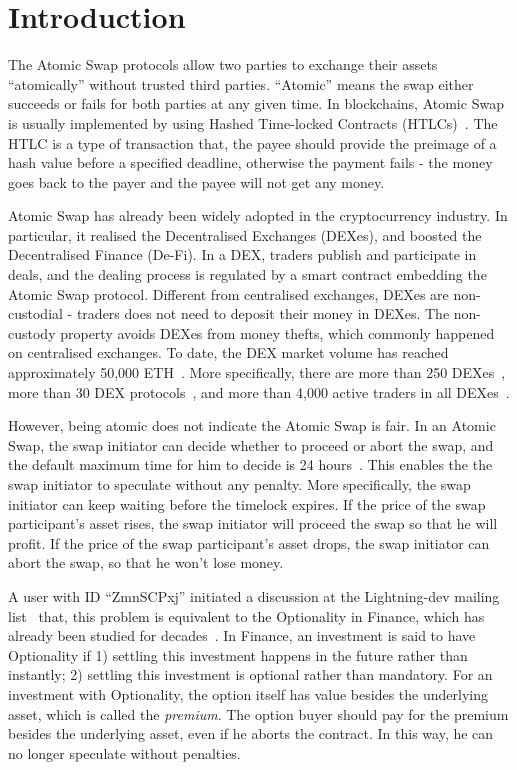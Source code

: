 \section{Introduction}
\label{sec:intro}

The Atomic Swap protocols allow two parties to exchange their assets ``atomically'' without trusted third parties.
``Atomic'' means the swap either succeeds or fails for both parties at any given time.
In blockchains, Atomic Swap is usually implemented by using Hashed Time-locked Contracts (HTLCs)~\cite{poon2016bitcoin}.
The HTLC is a type of transaction that, the payee should provide the preimage of a hash value before a specified deadline, otherwise the payment fails - the money goes back to the payer and the payee will not get any money.

Atomic Swap has already been widely adopted in the cryptocurrency industry.
In particular, it realised the Decentralised Exchanges (DEXes), and boosted the Decentralised Finance (De-Fi).
In a DEX, traders publish and participate in deals, and the dealing process is regulated by a smart contract embedding the Atomic Swap protocol.
Different from centralised exchanges, DEXes are non-custodial - traders does not need to deposit their money in DEXes.
The non-custody property avoids DEXes from money thefts, which commonly happened on centralised exchanges.
To date, the DEX market volume has reached approximately 50,000 ETH~\cite{dexwatch}.
More specifically,
there are more than 250 DEXes~\cite{distribuyed/index},
more than 30 DEX protocols~\cite{evbots/dex-protocols},
and more than 4,000 active traders in all DEXes~\cite{dexwatch}.



However, being atomic does not indicate the Atomic Swap is fair.
In an Atomic Swap, the swap initiator can decide whether to proceed or abort the swap, and the default maximum time for him to decide is 24 hours~\cite{nolan2013alt}.
This enables the the swap initiator to speculate without any penalty.
More specifically, the swap initiator can keep waiting before the timelock expires.
If the price of the swap participant's asset rises, the swap initiator will proceed the swap so that he will profit.
If the price of the swap participant's asset drops, the swap initiator can abort the swap, so that he won't lose money.

A user with ID ``ZmnSCPxj'' initiated a discussion at the Lightning-dev mailing list~\cite{optionality-origin} that, this problem is equivalent to the Optionality in Finance, which has already been studied for decades~\cite{higham2004introduction}.
In Finance, an investment is said to have Optionality if
1) settling this investment happens in the future rather than instantly;
2) settling this investment is optional rather than mandatory.
For an investment with Optionality, the option itself has value besides the underlying asset, which is called the \textit{premium}.
The option buyer should pay for the premium besides the underlying asset, even if he aborts the contract.
In this way, he can no longer speculate without penalties.

